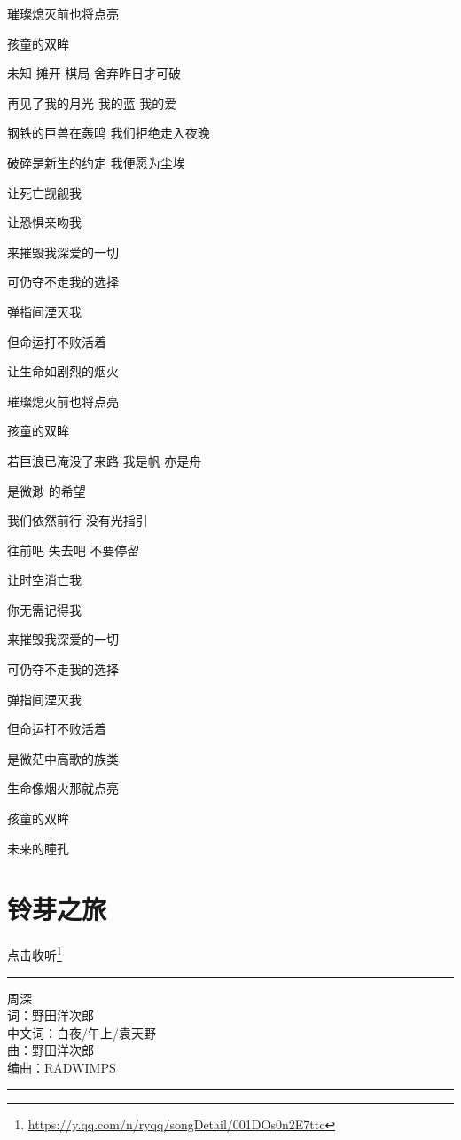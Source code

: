 \documentclass[]{ctexbook}
\renewcommand{\href}[2]{#2\footnote{\url{#1}}}
\begin{document}
璀璨熄灭前也将点亮

孩童的双眸

未知 摊开 棋局 舍弃昨日才可破

再见了我的月光 我的蓝 我的爱

钢铁的巨兽在轰鸣 我们拒绝走入夜晚

破碎是新生的约定 我便愿为尘埃

让死亡觊觎我

让恐惧亲吻我

来摧毁我深爱的一切

可仍夺不走我的选择

弹指间湮灭我

但命运打不败活着

让生命如剧烈的烟火

璀璨熄灭前也将点亮

孩童的双眸

若巨浪已淹没了来路 我是帆 亦是舟

是微渺 的希望

我们依然前行 没有光指引

往前吧 失去吧 不要停留

让时空消亡我

你无需记得我

来摧毁我深爱的一切

可仍夺不走我的选择

弹指间湮灭我

但命运打不败活着

是微茫中高歌的族类

生命像烟火那就点亮

孩童的双眸

未来的瞳孔

\section*{铃芽之旅}\label{travel-lingya}


\href{https://y.qq.com/n/ryqq/songDetail/001DOs0n2E7ttc}{点击收听}

\begin{center}\rule{0.5\linewidth}{0.5pt}\end{center}

周深\\
词：野田洋次郎\\
中文词：白夜/午上/袁天野\\
曲：野田洋次郎\\
编曲：RADWIMPS

\begin{center}\rule{0.5\linewidth}{0.5pt}\end{center}
\end{document}
